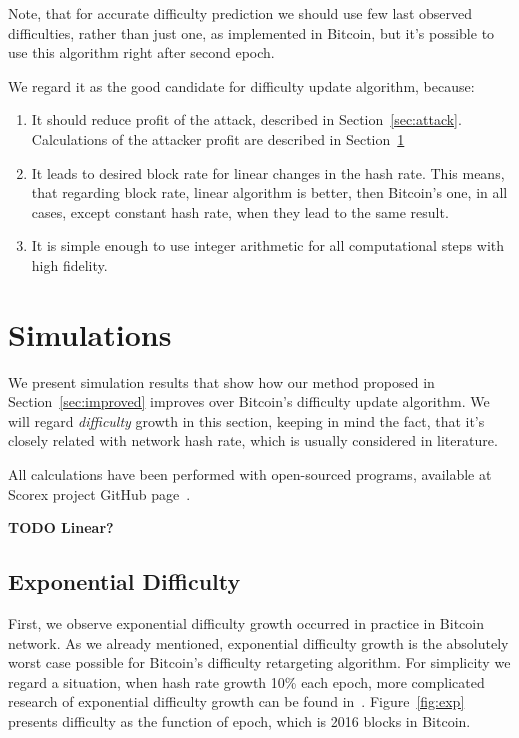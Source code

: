 \documentclass[]{llncs}
\begin{document}
Note, that for accurate difficulty prediction we should use few last observed difficulties, rather than just one, as implemented in Bitcoin, but it's possible to use this algorithm right after second epoch.


We regard it as the good candidate for difficulty update algorithm, because:
\begin{enumerate}
\item{It should reduce profit of the attack, described in Section~\ref{sec:attack}. Calculations of the attacker profit are described in Section~\ref{sec:sim}}
\item{It leads to desired block rate for linear changes in the hash rate.
This means, that regarding block rate, linear algorithm is better, then Bitcoin's one, in all cases, except constant hash rate, when they lead to the same result. }
\item{It is simple enough to use integer arithmetic for all computational steps with high fidelity.}
\end{enumerate}

\section{Simulations}
\label{sec:sim}

We present simulation results that show how our method proposed in Section~\ref{sec:improved} improves over Bitcoin’s difficulty update algorithm.
We will regard \textit{difficulty} growth in this section, keeping in mind the fact, that it's closely related with network hash rate, which is usually considered in literature.

All calculations have been performed with open-sourced programs, available at Scorex project GitHub page~\cite{scorex}.

\textbf{TODO Linear?}

\subsection{Exponential Difficulty}

First, we observe exponential difficulty growth occurred in practice in Bitcoin network. As we already mentioned, exponential difficulty growth is the absolutely worst case possible for Bitcoin’s difficulty retargeting algorithm.
For simplicity we regard a situation, when hash rate growth 10\% each epoch, more complicated research of exponential difficulty growth can be found in~\cite{kraft2015difficulty}.
Figure~\ref{fig:exp} presents difficulty as the function of epoch, which is 2016 blocks in Bitcoin.
\end{document}
